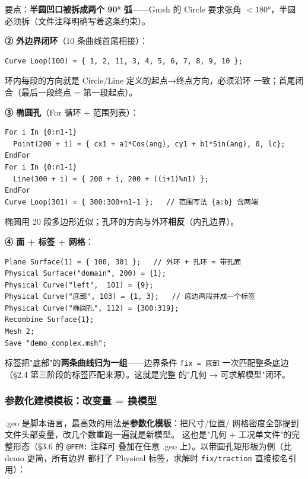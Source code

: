 \documentclass[12pt,a4paper]{ctexart}
\newcommand{\fem}{\Verb}
\begin{document}
要点：\textbf{半圆凹口被拆成两个 90° 弧}——Gmsh 的 Circle 要求张角
$<180°$，半圆必须拆（文件注释明确写着这条约束）。

\textbf{② 外边界闭环}（10 条曲线首尾相接）：

\begin{lstlisting}
Curve Loop(100) = { 1, 2, 11, 3, 4, 5, 6, 7, 8, 9, 10 };
\end{lstlisting}

环内每段的方向就是 Circle/Line 定义的起点→终点方向，必须沿环
一致；首尾闭合（最后一段终点 = 第一段起点）。

\textbf{③ 椭圆孔}（For 循环 + 范围列表）：

\begin{lstlisting}
For i In {0:n1-1}
  Point(200 + i) = { cx1 + a1*Cos(ang), cy1 + b1*Sin(ang), 0, lc};
EndFor
For i In {0:n1-1}
  Line(300 + i) = { 200 + i, 200 + ((i+1)%n1) };
EndFor
Curve Loop(301) = { 300:300+n1-1 };   // 范围写法 {a:b} 含两端
\end{lstlisting}

椭圆用 20 段多边形近似；孔环的方向与外环\textbf{相反}（内孔边界）。

\textbf{④ 面 + 标签 + 网格}：

\begin{lstlisting}
Plane Surface(1) = { 100, 301 };   // 外环 + 孔环 = 带孔面
Physical Surface("domain", 200) = {1};
Physical Curve("left",  101) = {9};
Physical Curve("底部", 103) = {1, 3};   // 底边两段并成一个标签
Physical Curve("椭圆孔", 112) = {300:319};
Recombine Surface{1};
Mesh 2;
Save "demo_complex.msh";
\end{lstlisting}

标签把"底部"的\textbf{两条曲线归为一组}——边界条件 \fem|fix = 底部|
一次匹配整条底边（§2.4 第三阶段的标签匹配来源）。这就是完整
的"几何 → 可求解模型"闭环。

\subsubsection{参数化建模模板：改变量 = 换模型}

.geo 是脚本语言，最高效的用法是\textbf{参数化模板}：把尺寸/位置/
网格密度全部提到文件头部变量，改几个数重跑一遍就是新模型。
这也是"几何 + 工况单文件"的完整形态（§3.6 的 \fem|@FEM:| 注释可
叠加在任意 .geo 上）。以带圆孔矩形板为例（比 demo 更简，所有边界
都打了 Physical 标签，求解时 \fem|fix/traction| 直接按名引用）：
\end{document}
